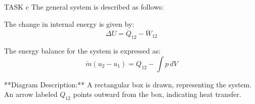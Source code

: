 TASK c  
The general system is described as follows:  

The change in internal energy is given by:  
\[
\Delta U = \dot{Q}_{12} - \dot{W}_{12}
\]  

The energy balance for the system is expressed as:  
\[
\dot{m} \left( u_2 - u_1 \right) = Q_{12} - \int p \, dV
\]  

**Diagram Description:**  
A rectangular box is drawn, representing the system. An arrow labeled \( Q_{12} \) points outward from the box, indicating heat transfer.
